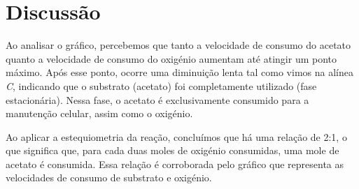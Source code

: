 \documentclass[\mainfilename]{subfiles}
\begin{document}
\begin{sectionBox}
\begin{center}
    \end{center}

    \section*{Discussão}
    Ao analisar o gráfico, percebemos que tanto a velocidade de consumo do acetato quanto a velocidade de consumo do oxigénio aumentam até atingir um ponto máximo. Após esse ponto, ocorre uma diminuição lenta tal como vimos na alínea \textit{C}, indicando que o substrato (acetato) foi completamente utilizado (fase estacionária). Nessa fase, o acetato é exclusivamente consumido para a manutenção celular, assim como o oxigénio.\par
    Ao aplicar a estequiometria da reação, concluímos que há uma relação de 2:1, o que significa que, para cada duas moles de oxigénio consumidas, uma mole de acetato é consumida. Essa relação é corroborada pelo gráfico que representa as velocidades de consumo de substrato e oxigénio.
    
\end{sectionBox}
\end{document}
